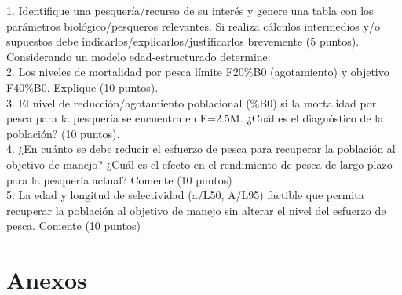 \documentclass{uofa-eng-assignment}
\begin{document}
\maketitle

1. Identifique una pesquería/recurso de su interés y genere una tabla con los parámetros biológico/pesqueros relevantes. Si realiza cálculos intermedios y/o supuestos debe indicarlos/explicarlos/justificarlos brevemente (5 puntos). \\

Considerando un modelo edad-estructurado determine:\\

2. Los niveles de mortalidad por pesca límite F20\%B0 (agotamiento) y objetivo F40\%B0. Explique (10 puntos).\\


3. El nivel de reducción/agotamiento poblacional (\%B0) si la mortalidad por pesca para la pesquería se encuentra en F=2.5M.  ¿Cuál es el diagnóstico de la población? (10 puntos).\\


4. ¿En cuánto se debe reducir el esfuerzo de pesca para recuperar la población al objetivo de manejo?  ¿Cuál es el efecto en el rendimiento de pesca de largo plazo para la pesquería actual?  Comente (10 puntos)\\


5. La edad y longitud de selectividad (a/L50, A/L95) factible que permita recuperar la población al objetivo de manejo sin alterar el nivel del esfuerzo de pesca. Comente (10 puntos)\\


\section*{Anexos}
\end{document}
